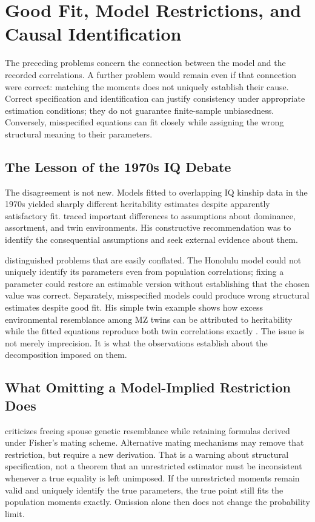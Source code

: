 \section{Good Fit, Model Restrictions, and Causal Identification}
\label{sec:identification-limits}
The preceding problems concern the connection between the model and the
recorded correlations. A further problem would remain even if that connection
were correct: matching the moments does not uniquely establish their cause.
Correct specification and identification can justify consistency under
appropriate estimation conditions; they do not guarantee finite-sample
unbiasedness. Conversely, misspecified equations can fit closely while
assigning the wrong structural meaning to their parameters.

\subsection{The Lesson of the 1970s IQ Debate}
\label{sec:1970s-precedent}
The disagreement is not new. Models fitted to overlapping IQ kinship data
in the 1970s yielded sharply different heritability estimates despite
apparently satisfactory fit. \citet{Loehlin1978} traced important differences
to assumptions about dominance, assortment, and twin environments. His
constructive recommendation was to identify the consequential assumptions
and seek external evidence about them.

\citet{Goldberger1978} distinguished problems that are easily conflated.
The Honolulu model could not uniquely identify its parameters even from
population correlations; fixing a parameter could restore an estimable
version without establishing that the chosen value was correct. Separately,
misspecified models could produce wrong structural estimates despite good
fit. His simple twin example shows how excess environmental resemblance
among MZ twins can be attributed to heritability while the fitted equations
reproduce both twin correlations exactly \citep[p.~72]{Goldberger1978}.
The issue is not merely imprecision. It is what the observations establish
about the decomposition imposed on them.

\subsection{What Omitting a Model-Implied Restriction Does}
\citet[p.~19]{Goldberger1978} criticizes freeing spouse genetic resemblance while
retaining formulas derived under Fisher's mating scheme. Alternative
mating mechanisms may remove that restriction, but require a new derivation.
That is a warning about structural specification, not a theorem that an
unrestricted estimator must be inconsistent whenever a true equality is
left unimposed. If the unrestricted moments remain valid and uniquely
identify the true parameters, the true point still fits the population
moments exactly. Omission alone then does not change the probability limit.

